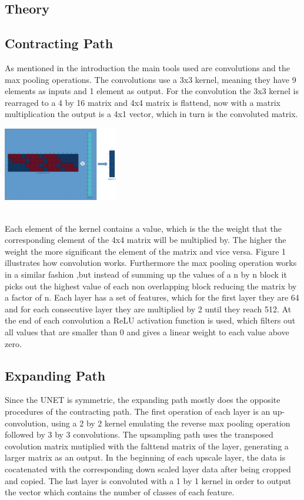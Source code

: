 \documentclass{article}
\begin{document}
\begin{multicols}{2}
\section{Theory}
\subsection{Contracting Path}
As mentioned in the introduction the main tools used are convolutions and the max pooling operations. 
The convolutions use a 3x3 kernel, meaning they have 9 elements as inputs and 1 element as output. For the convolution the 
3x3 kernel is rearraged to a 4 by 16 matrix and 4x4 matrix is flattend, now with a matrix multiplication the output is a 4x1 vector, which in turn
is the convoluted matrix. \\
\begin{minipage}{5cm}
\centering
\includegraphics[width=5cm, keepaspectratio]{convolution.png}
\end{minipage}
\\Each element of the kernel contains a value,
which is the the weight that the corresponding element of the 4x4 matrix will be multiplied by. The higher the weight the more significant 
the element of the matrix and vice versa.
Figure 1 illustrates how convolution works. Furthermore the max pooling operation works in a similar fashion ,but instead of summing 
up the values of a n by n block it picks out the highest value of each non overlapping block reducing the matrix by a factor of n. Each layer 
has a set of features, which for the first layer they are 64 and for each consecutive layer they are multiplied by 2 until they reach 512. At the 
end of each convolution a ReLU activation function is used, which filters out all values that are smaller than 0 and gives a linear weight to 
each value above zero.  
\subsection{Expanding Path}
Since the UNET is symmetric, the expanding path mostly does the opposite procedures of the contracting path. The first operation of each layer is an up-convolution,
using a 2 by 2 kernel emulating the reverse max pooling operation followed by 3 by 3 convolutions. The upsampling path uses the transposed 
covolution matrix mutiplied with the falttend matrix of the layer, generating a larger matrix as an output. In the beginning of each upscale layer, the data
is cocatenated with the corresponding down scaled layer data after being cropped and copied. The last layer is convoluted with a 1 by 1 kernel 
in order to output the vector which contains the number of classes of each feature.


\end{multicols}
\end{document}
